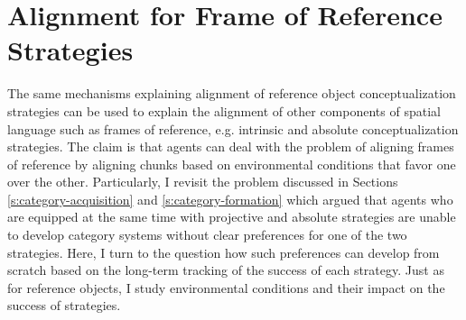 %


\section{Alignment for Frame of Reference Strategies}
The same mechanisms explaining alignment of reference object conceptualization strategies 
can be used to explain the alignment of
other components of spatial language such as frames of reference, e.g. intrinsic and absolute
conceptualization strategies. The claim is that agents can deal 
with the problem of aligning frames of reference by aligning chunks based on environmental 
conditions that favor one over the other. Particularly, I revisit the problem discussed
in Sections \ref{s:category-acquisition} and \ref{s:category-formation} which argued
that agents who are equipped at the same time with projective and absolute 
strategies are unable to develop category systems without clear preferences for one of the 
two strategies. Here, I turn to the question how such preferences can develop from
scratch based on the long-term tracking of the success of each strategy. 
Just as for reference objects, I study environmental conditions 
and their impact on the success of strategies. 


